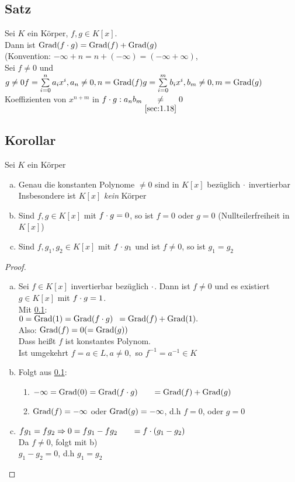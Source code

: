 \subsection{Satz}\label{sec:1.23}
Sei $K$ ein Körper, $f,g \in K[x]$.\\
Dann ist $\operatorname{Grad}(f\cdot g) = \operatorname{Grad}(f) + \operatorname{Grad}(g)$\\
(Konvention: $-\infty + n = n + (- \infty) = (-\infty + \infty)$,\\
Sei $f \ne 0$ und $g \ne 0\\
f = \sum\limits_{i=0}^{n}a_ix^i, a_n \ne 0, n =\operatorname{Grad}(f)\\
g = \sum\limits_{i=0}^{m}b_ix^i, b_m \ne 0, m =\operatorname{Grad}(g)$\\
Koeffizienten von $x^{n+m}$ in $f \cdot g : a_nb_m \underset{\ref{sec:1.18}}{\ne} 0$
\subsection{Korollar}\label{sec:1.24}
Sei $K$ ein Körper
\begin{enumerate}[a)]
\item Genau die konstanten Polynome $\ne 0$ sind in $K[x]$ bezüglich $\cdot$ invertierbar\\
Insbesondere ist $K[x]$ \emph{kein} Körper
\item Sind $f,g\in K[x]$ mit $f\cdot g = 0$, so ist $f = 0$ oder $g = 0$ (Nullteilerfreiheit in $K[x]$)
\item Sind $f,g_1,g_2 \in K[x]$ mit $f\cdot g_1$ und ist $f \ne 0$, so ist $g_1 = g_2$
\end{enumerate}
\begin{proof}\
\begin{enumerate}[a)]
\item Sei $f \in K[x]$ invertierbar bezüglich $\cdot$. Dann ist $f \ne 0$ und es existiert $g \in K[x]$ mit $f \cdot g = 1$.\\
Mit \ref{sec:1.23}:\\
$ 0 = \operatorname{Grad}(1) = \operatorname{Grad}(f \cdot g)\\
\phantom{ 0 } = \operatorname{Grad}(f) + \operatorname{Grad}(1).$\\
Also: $\operatorname{Grad}(f) = 0 (= \operatorname{Grad}(g))$\\
Dass hei\ss t $f$ ist konstantes Polynom.\\
Ist umgekehrt $f = a \in L, a \ne 0,$ so $f^{-1} = a^{-1} \in K$
\item Folgt aus \ref{sec:1.23}:
\begin{enumerate}[ \ ]
\item[ \ ] $-\infty = \operatorname{Grad}(0) = \operatorname{Grad}(f \cdot g)\\
\phantom{-\infty} = \operatorname{Grad}(f) + \operatorname{Grad}(g)$
\item[$\Rightarrow$]$\operatorname{Grad}(f) = -\infty$ oder $\operatorname{Grad}(g) = -\infty$, d.h $f = 0$, oder $g = 0$
\end{enumerate}
\item $fg_1 = fg_2\\
\Rightarrow 0 = fg_1 - fg_2
\phantom{\Rightarrow 0} = f \cdot (g_1 - g_2)$\\
Da $f \ne 0$, folgt mit b)\\
$g_1 - g_2 = 0$, d.h $g_1 = g_2$
\end{enumerate}
\end{proof}
